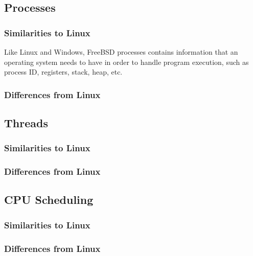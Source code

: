 \documentclass[letterpaper,10pt,titlepage]{article}
\begin{document}
\subsection{Processes}
\subsubsection{Similarities to Linux}
Like Linux and Windows, FreeBSD processes contains information that an operating system needs to have in order to handle program execution, such as process ID, registers, stack, heap, etc. 
\subsubsection{Differences from Linux}
\subsection{Threads}
\subsubsection{Similarities to Linux}
\subsubsection{Differences from Linux}
\subsection{CPU Scheduling}
\subsubsection{Similarities to Linux}
\subsubsection{Differences from Linux}

\newpage
{}

\end{document}
